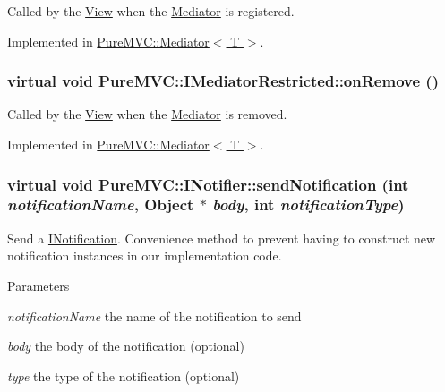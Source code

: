 Called by the \hyperlink{class_pure_m_v_c_1_1_view}{View} when the \hyperlink{class_pure_m_v_c_1_1_mediator}{Mediator} is registered. 

Implemented in \hyperlink{class_pure_m_v_c_1_1_mediator_a35ee4974b074dbd94b5175968f31379e}{PureMVC::Mediator$<$ T $>$}.\hypertarget{class_pure_m_v_c_1_1_i_mediator_restricted_ae6e471d85f08ed86fae3b1e7377f8d69}{
\subsubsection[{onRemove}]{\setlength{\rightskip}{0pt plus 5cm}virtual void PureMVC::IMediatorRestricted::onRemove ()}}
\label{class_pure_m_v_c_1_1_i_mediator_restricted_ae6e471d85f08ed86fae3b1e7377f8d69}


Called by the \hyperlink{class_pure_m_v_c_1_1_view}{View} when the \hyperlink{class_pure_m_v_c_1_1_mediator}{Mediator} is removed. 

Implemented in \hyperlink{class_pure_m_v_c_1_1_mediator_a2fc2d7f514cb9a8b25d40185157c7a48}{PureMVC::Mediator$<$ T $>$}.\hypertarget{class_pure_m_v_c_1_1_i_notifier_a65e8333ccfea74138b79f84dac96af25}{
\subsubsection[{sendNotification}]{\setlength{\rightskip}{0pt plus 5cm}virtual void PureMVC::INotifier::sendNotification (int {\em notificationName}, \/  {\bf Object} $\ast$ {\em body}, \/  int {\em notificationType})}}
\label{class_pure_m_v_c_1_1_i_notifier_a65e8333ccfea74138b79f84dac96af25}


Send a {\ttfamily \hyperlink{class_pure_m_v_c_1_1_i_notification}{INotification}}. Convenience method to prevent having to construct new notification instances in our implementation code.


\begin{DoxyParams}{Parameters}
\item[{\em notificationName}]the name of the notification to send \item[{\em body}]the body of the notification (optional) \item[{\em type}]the type of the notification (optional) \end{DoxyParams}


